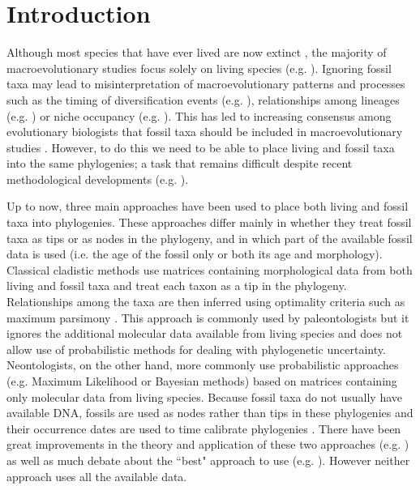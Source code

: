 \documentclass[10pt,letterpaper]{article}
\begin{document}
\linenumbers

%
%

\section*{Introduction}
Although most species that have ever lived are now extinct \cite{novacek1992ext,raup1993extinction}, the majority of macroevolutionary studies focus solely on living species (e.g. \cite{meredithimpacts2011,jetzthe2012}). Ignoring fossil taxa may lead to misinterpretation of macroevolutionary patterns and processes such as the timing of diversification events (e.g. \cite{pyrondivergence2011}), relationships among lineages (e.g. \cite{manosphylogeny2007}) or niche occupancy (e.g. \cite{pearmanniche2008}). This has led to increasing consensus among evolutionary biologists that fossil taxa should be included in macroevolutionary studies \cite{jacksonwhat2006,quentaldiversity2010,dietlconservation2011,slaterunifying2013,fritzdiversity2013}. However, to do this we need to be able to place living and fossil taxa into the same phylogenies; a task that remains difficult despite recent methodological developments (e.g. \cite{pyrondivergence2011,ronquista2012,BEASTmaster}).

Up to now, three main approaches have been used to place both living and fossil taxa into phylogenies. These approaches differ mainly in whether they treat fossil taxa as tips or as nodes in the phylogeny, and in which part of the available fossil data is used (i.e. the age of the fossil only or both its age and morphology). Classical cladistic methods use matrices containing morphological data from both living and fossil taxa and treat each taxon as a tip in the phylogeny. Relationships among the taxa are then inferred using optimality criteria such as maximum parsimony \cite{simpson1945}. This approach is commonly used by paleontologists but it ignores the additional molecular data available from living species and does not allow use of probabilistic methods for dealing with phylogenetic uncertainty. Neontologists, on the other hand, more commonly use probabilistic approaches (e.g. Maximum Likelihood or Bayesian methods) based on matrices containing only molecular data from living species. Because fossil taxa do not usually have available DNA, fossils are used as nodes rather than tips in these phylogenies and their occurrence dates are used to time calibrate phylogenies \cite{zuckerkandl1965}. There have been great improvements in the theory and application of these two approaches (e.g. \cite{bapsta2013,stadlerdating2013,heaththe2013}) as well as much debate about the ``best" approach to use (e.g. \cite{spencerefficacy2013,wrightbayesian2014}). However neither approach uses all the available data.
\end{document}
